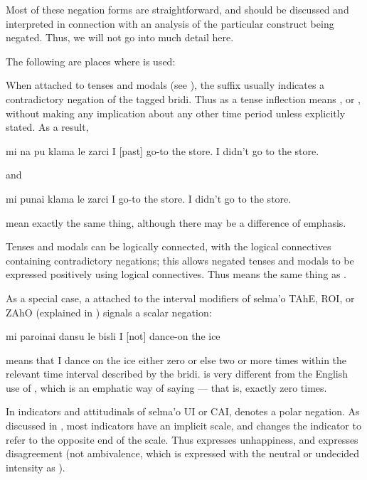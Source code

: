 Most of these negation forms are straightforward, and should
    be discussed and interpreted in connection with an analysis of
    the particular construct being negated. Thus, we will not go
    into much detail here.

The following are places where  is used:

When attached to tenses and modals (see ), the  suffix usually
    indicates a contradictory negation of the tagged bridi. Thus
     as a tense inflection means , or
    , without making any implication about any
    other time period unless explicitly stated. As a result,
\begin{example}
mi na pu klama le zarci\n
I  [past] go-to the store.\n
I didn't go to the store.
\end{example}

{\noindent}and
\begin{example}
mi punai klama le zarci\n
I  go-to the store.\n
I didn't go to the store.
\end{example}

{\noindent}mean exactly the same thing, although there may be a difference
    of emphasis. 

Tenses and modals can be logically connected, with the
    logical connectives containing contradictory negations; this
    allows negated tenses and modals to be expressed positively
    using logical connectives. Thus  means the same
    thing as .

As a special case, a  attached to the interval
    modifiers of selma'o TAhE, ROI, or ZAhO (explained in ) signals a scalar
    negation:
\begin{example}
mi paroinai dansu le bisli\n
I  [not] dance-on the ice
\end{example}

{\noindent}means that I dance on the ice either zero or else two or more
    times within the relevant time interval described by the bridi.
     is very different from the
    English use of , which is an emphatic way of saying
     --- that is, exactly zero times. 

In indicators and attitudinals of selma'o UI or CAI, 
    denotes a polar negation. As discussed in , most indicators have an
    implicit scale, and  changes the indicator to refer to
    the opposite end of the scale. Thus  expresses
    unhappiness, and  expresses disagreement (not
    ambivalence, which is expressed with the neutral or undecided
    intensity as ).

